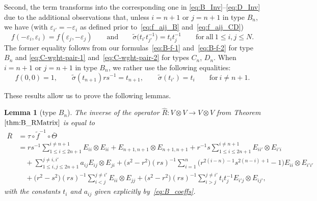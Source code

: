 \documentclass[pdftex]{sigma}
\numberwithin{equation}{section}
\newtheorem{Lemma}[Theorem]{Lemma}
\begin{document}
Second, the term  transforms into the corresponding one in \eqref{eq:B_Inv}--\eqref{eq:D_Inv} due to the additional observations that, unless $i = n + 1$ or $j = n + 1$ in type $B_{n}$, we have (with $\varepsilon_{i'}=-\varepsilon_{i}$ as defined prior to~\eqref{eq:f_aij_B} and~\eqref{eq:f_aij_CD})
\begin{displaymath}
 f(-\varepsilon_{i},\varepsilon_{i}) = f(\varepsilon_{j},-\varepsilon_{j})
 \qquad \text{and} \qquad \widetilde{\sigma}\bigl(t_{i'}t_{j'}^{-1}\bigr) = t_{i}t_{j}^{-1}
 \qquad \mathrm{for\ all} \ 1\leq i,j\leq N.
\end{displaymath}
The former equality follows from our formulas~\eqref{eq:B-f-1} and~\eqref{eq:B-f-2} for type $B_n$ and \eqref{eq:C-wght-pair-1} and~\eqref{eq:C-wght-pair-2} for types $C_n$, $D_n$. When $i=n+1$ or $j=n+1$ in type $B_n$, we rather use the following equalities:
\begin{displaymath}
 f(0,0) = 1,\qquad \widetilde{\sigma}(t_{n+1})rs^{-1} = t_{n+1},\qquad
 \widetilde{\sigma}(t_{i'}) = t_{i} \qquad \mathrm{for} \ i \neq n + 1.
\end{displaymath}

These results allow us to prove the following lemmas.

\begin{Lemma}[type $B_{n}$]\label{lem:B_Inverse}
The inverse of the operator $\hat{R}\colon V \otimes V \to V \otimes V$ from Theorem $\ref{thm:B_RMatrix}$ is equal to
\begin{align}
 \overline{R} &= \tau \circ \widetilde{f}^{-1} \circ \overline{\Theta} \nonumber\\
 &= rs^{-1}\sum_{1\leq i\leq 2n+1}^{i\ne n+1} E_{ii} \otimes E_{ii} + E_{n+1,n+1} \otimes E_{n+1,n+1} +
 r^{-1}s \sum_{1\leq i\leq 2n+1}^{i\ne n+1} E_{ii'} \otimes E_{i'i} \nonumber\\
 &\quad + \sum_{1\leq i,j\leq 2n+1}^{j\ne i,i'} a_{ij} E_{ij} \otimes E_{ji}
 + \bigl(s^{2} - r^{2}\bigr)(rs)^{-1}\sum_{i = 1}^{n}\bigl(r^{2(i - n) - 1}s^{2(n-i) + 1} - 1\bigr) E_{ii} \otimes E_{i'i'} \nonumber\\
 &\quad + \bigl(r^{2} - s^{2}\bigr)(rs)^{-1} \sum_{i<j}^{j\ne i'} E_{ii} \otimes E_{jj}
 + \bigl(s^{2} - r^{2}\bigr)(rs)^{-1}\sum_{i > j}^{j \ne i'} t_{i}t_{j}^{-1}E_{i'j} \otimes E_{ij'},\label{eq:B_Inv}
\end{align}
with the constants $t_{i}$ and $a_{ij}$ given explicitly by~\eqref{eq:B_coeffs}.
\end{Lemma}
\end{document}
